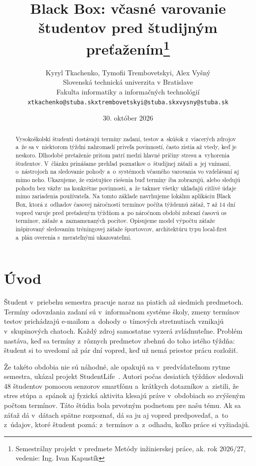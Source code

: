 \documentclass[10pt,twoside,slovak,a4paper]{article}
\title{Black Box: včasné varovanie študentov pred študijným preťažením\thanks{Semestrálny projekt v predmete Metódy inžinierskej práce, ak. rok 2026/27, vedenie: Ing. Ivan Kapustík}} %
\author{Kyryl Tkachenko, Tymofii Trembovetskyi, Alex Vyšný\\[2pt]
	{\small Slovenská technická univerzita v Bratislave}\\
	{\small Fakulta informatiky a informačných technológií}\\
	{\small \texttt{xtkachenko@stuba.sk}\quad\texttt{xtrembovetskyi@stuba.sk}\quad\texttt{xvysny@stuba.sk}}
	}
\date{\small 30. október 2026}
\begin{document}
\maketitle

\begin{abstract}
Vysokoškolskí študenti dostávajú termíny zadaní, testov a~skúšok z~viacerých
zdrojov a~že sa v~niektorom týždni nahromadí priveľa povinností, často zistia
až vtedy, keď je neskoro. Dlhodobé preťaženie pritom patrí medzi hlavné príčiny
stresu a~vyhorenia študentov. V~článku prinášame prehľad poznatkov o~študijnej
záťaži a~jej vnímaní, o~nástrojoch na sledovanie pohody a~o~systémoch včasného
varovania vo vzdelávaní aj mimo neho. Ukazujeme, že existujúce riešenia buď
termíny iba zobrazujú, alebo sledujú pohodu bez väzby na konkrétne povinnosti,
a~že takmer všetky ukladajú citlivé údaje mimo zariadenia používateľa. Na tomto
základe navrhujeme lokálnu aplikáciu Black Box, ktorá z~odhadov časovej
náročnosti termínov počíta týždennú záťaž, 7 až 14 dní vopred varuje pred
preťaženým týždňom a~po náročnom období zobrazí časovú os termínov, záťaže
a~zaznamenaných pocitov. Opisujeme model výpočtu záťaže inšpirovaný
sledovaním tréningovej záťaže športovcov, architektúru typu local-first
a~plán overenia s~merateľnými ukazovateľmi.
\end{abstract}



\section{Úvod}

Študent v~priebehu semestra pracuje naraz na piatich až siedmich predmetoch.
Termíny odovzdania zadaní sú v~informačnom systéme školy, zmeny termínov
testov prichádzajú e-mailom a~dohody o~tímových stretnutiach vznikajú
v~skupinových chatoch. Každý zdroj samostatne vyzerá zvládnuteľne. Problém nastáva,
keď sa termíny z~rôznych predmetov zbehnú do toho istého týždňa: študent si to
uvedomí až pár dní vopred, keď už nemá priestor prácu rozložiť.

Že takéto obdobia nie sú náhodné, ale opakujú sa v~predvídateľnom rytme
semestra, ukázal projekt StudentLife~\cite{Wang:StudentLife}. Autori počas
desiatich týždňov sledovali 48 študentov pomocou senzorov smartfónu
a~krátkych dotazníkov a~zistili, že stres stúpa a~spánok aj fyzická aktivita
klesajú práve v~obdobiach so zvýšeným počtom termínov. Táto štúdia bola
prvotným podnetom pre našu tému. Ak sa záťaž dá v~dátach spätne rozpoznať,
dá sa ju aj vopred predpovedať, a~to z~údajov, ktoré študent pozná: z~termínov
a~z~odhadu, koľko práce si vyžiadajú.
\end{document}
